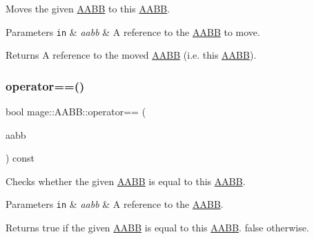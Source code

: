 Moves the given \mbox{\hyperlink{classmage_1_1_a_a_b_b}{A\+A\+BB}} to this \mbox{\hyperlink{classmage_1_1_a_a_b_b}{A\+A\+BB}}.


\begin{DoxyParams}[1]{Parameters}
\mbox{\tt in}  & {\em aabb} & A reference to the \mbox{\hyperlink{classmage_1_1_a_a_b_b}{A\+A\+BB}} to move. \\
\hline
\end{DoxyParams}
\begin{DoxyReturn}{Returns}
A reference to the moved \mbox{\hyperlink{classmage_1_1_a_a_b_b}{A\+A\+BB}} (i.\+e. this \mbox{\hyperlink{classmage_1_1_a_a_b_b}{A\+A\+BB}}). 
\end{DoxyReturn}
\mbox{\label{classmage_1_1_a_a_b_b_a9297ff005f7bdcd934d744a6fb7ab5c9}} 
\subsubsection{\texorpdfstring{operator==()}{operator==()}}
{\footnotesize\ttfamily bool mage\+::\+A\+A\+B\+B\+::operator== (\begin{DoxyParamCaption}\item[{const \mbox{\hyperlink{classmage_1_1_a_a_b_b}{A\+A\+BB}} \&}]{aabb }\end{DoxyParamCaption}) const\hspace{0.3cm}{\ttfamily [noexcept]}}

Checks whether the given \mbox{\hyperlink{classmage_1_1_a_a_b_b}{A\+A\+BB}} is equal to this \mbox{\hyperlink{classmage_1_1_a_a_b_b}{A\+A\+BB}}.


\begin{DoxyParams}[1]{Parameters}
\mbox{\tt in}  & {\em aabb} & A reference to the \mbox{\hyperlink{classmage_1_1_a_a_b_b}{A\+A\+BB}}. \\
\hline
\end{DoxyParams}
\begin{DoxyReturn}{Returns}
{\ttfamily true} if the given \mbox{\hyperlink{classmage_1_1_a_a_b_b}{A\+A\+BB}} is equal to this \mbox{\hyperlink{classmage_1_1_a_a_b_b}{A\+A\+BB}}. {\ttfamily false} otherwise. 
\end{DoxyReturn}
\mbox{\label{classmage_1_1_a_a_b_b_a35bf465fbd8571acc2707fa555b9245b}} 
